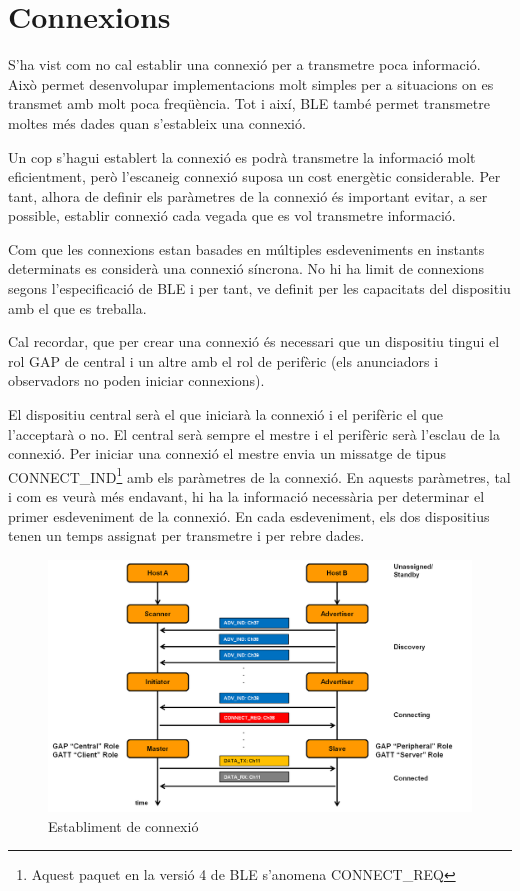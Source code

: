 \section{Connexions}
S'ha vist com no cal establir una connexió per a transmetre poca informació.
Això permet desenvolupar implementacions molt simples per a situacions on es transmet amb molt poca freqüència. Tot i així, BLE també permet transmetre moltes més dades quan s'estableix una connexió.

Un cop s'hagui establert la connexió es podrà transmetre la informació molt eficientment, però l'escaneig connexió suposa un cost energètic considerable.
Per tant, alhora de definir els paràmetres de la connexió és important evitar, a ser possible, establir connexió cada vegada que es vol transmetre informació.

Com que les connexions estan basades en múltiples esdeveniments en instants determinats es considerà una connexió síncrona.
No hi ha limit de connexions segons l'especificació de BLE i per tant, ve definit per les capacitats del dispositiu amb el que es treballa.

Cal recordar, que per crear una connexió és necessari que un dispositiu tingui el rol GAP de central i un altre amb el rol de perifèric (els anunciadors i observadors no poden iniciar connexions).

El dispositiu central serà el que iniciarà la connexió i el perifèric el que l'acceptarà o no.
El central serà sempre el mestre i el perifèric serà l'esclau de la connexió.
Per iniciar una connexió el mestre envia un missatge de tipus CONNECT\_IND\footnote{Aquest paquet en la versió 4 de BLE s'anomena CONNECT\_REQ} amb els paràmetres de la connexió.
En aquests paràmetres, tal i com es veurà més endavant, hi ha la informació necessària per determinar el primer esdeveniment de la connexió.
En cada esdeveniment, els dos dispositius tenen un temps assignat per transmetre i per rebre dades.

\begin{figure}[h]
	\begin{center}
		\includegraphics[width=1.2\textwidth]{./images/rols_unicast.png}
		\caption{Establiment de connexió}
		\label{fig:unicast_roles}
	\end{center}
\end{figure}


